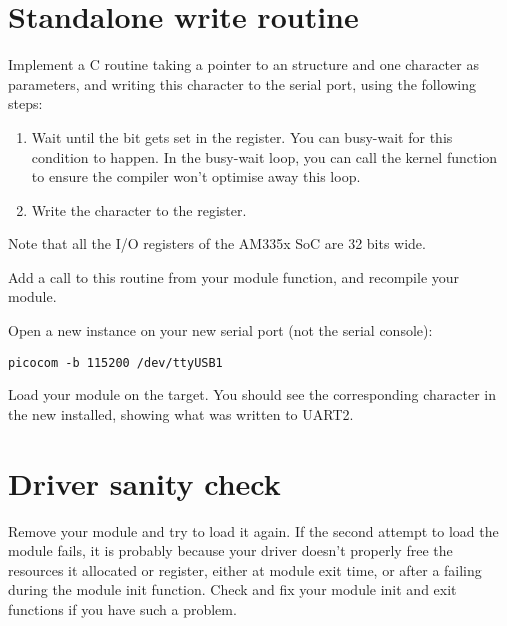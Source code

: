 \section{Standalone write routine}

Implement a C routine taking a pointer to an 
structure and one character as parameters, and writing
this character to the serial port, using the following steps:

\begin{enumerate}
\item Wait until the  bit gets set in the
   register.  You can busy-wait for this condition to happen.
  In the busy-wait loop, you can call the  kernel function
  to ensure the compiler won't optimise away this loop.
\item Write the character to the  register.
\end{enumerate}

Note that all the I/O registers of the AM335x SoC are 32 bits wide.

Add a call to this routine from your module  function,
and recompile your module.

Open a new  instance on your new serial port (not the
serial console):

\begin{verbatim}
picocom -b 115200 /dev/ttyUSB1
\end{verbatim}

Load your module on the target. You should see the
corresponding character in the new  installed,
showing what was written to UART2.

\section{Driver sanity check}

Remove your module and try to load it again. If the second attempt to
load the module fails, it is probably because your driver doesn't
properly free the resources it allocated or register, either at module
exit time, or after a failing during the module init function. Check
and fix your module init and exit functions if you have such a
problem.
